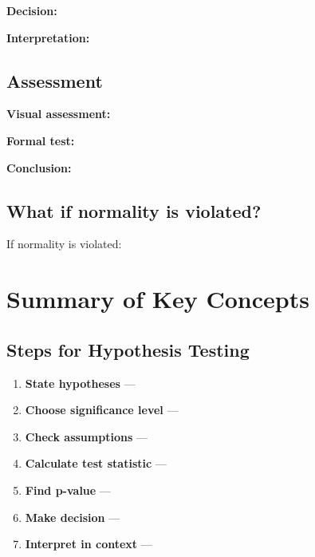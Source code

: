 \documentclass[11pt]{article}
\begin{document}
\textbf{Decision:}

\vspace{1cm}

\textbf{Interpretation:}

\vspace{2cm}

\subsection*{Assessment}

\textbf{Visual assessment:}

\vspace{3cm}

\textbf{Formal test:}

\vspace{1cm}

\textbf{Conclusion:}

\vspace{2cm}

\subsection*{What if normality is violated?}

If normality is violated:

\vspace{5cm}

\pagebreak

\section*{Summary of Key Concepts}

\subsection*{Steps for Hypothesis Testing}

\begin{enumerate}
\item \textbf{State hypotheses} ---
\item \textbf{Choose significance level} ---
\item \textbf{Check assumptions} ---
\item \textbf{Calculate test statistic} ---
\item \textbf{Find p-value} ---
\item \textbf{Make decision} ---
\item \textbf{Interpret in context} ---
\end{enumerate}
\end{document}
